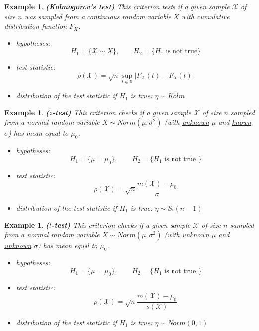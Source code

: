 \documentclass[12pt]{article}
\newtheorem{example}[theorem]{Example}
\begin{document}
\begin{example} \textbf{(Kolmogorov's test)} This criterion tests if a given
    sample $\mathscr{X}$ of size $n$ was sampled from a continuous random
    variable $X$ with cumulative distribution function $F_X$.
    \begin{itemize}
        \item hypotheses:
              $$H_1=\{\mathscr{X}\sim X\},\quad\quad H_2=\{H_1\mbox{ is not
                      true}\}$$
        \item test statistic:
              $$\rho(\mathscr{X})
                  =\sqrt{n}\sup_{t\in\mathbb{R}}|F_{\mathscr{X}}(t)-F_X(t)|$$
        \item distribution of the test statistic if $H_1$ is true: $\eta\sim Kolm$
    \end{itemize}
\end{example}

\begin{example} \textbf{($z$-test)} This criterion checks if a given sample
    $\mathscr{X}$ of size $n$ sampled from a normal random variable $X\sim
        Norm(\mu,\sigma^2)$ (with \underline{unknown} $\mu$ and \underline{known}
    $\sigma$) has mean equal to $\mu_0$.
    \begin{itemize}
        \item hypotheses:
              $$H_1=\{\mu=\mu_0\},\quad\quad H_2=\{H_1\mbox{ is not true }\}$$
        \item test statistic:
              $$\rho(\mathscr{X})=\sqrt{n}\frac{m(\mathscr{X})-\mu_0}{\sigma}$$
        \item distribution of the test statistic if $H_1$ is true: $\eta\sim
                  St(n-1)$
    \end{itemize}
\end{example}

\begin{example} \textbf{($t$-test)} This criterion checks if a given sample
    $\mathscr{X}$ of size $n$ sampled from a normal random variable
    $X\sim Norm(\mu,\sigma^2)$ (with \underline{unknown} $\mu$ and
    \underline{unknown} $\sigma$) has mean equal to $\mu_0$.
    \begin{itemize}
        \item hypotheses:
              $$H_1=\{\mu=\mu_0\},\quad\quad H_2=\{H_1\mbox{ is not true }\}$$
        \item test statistic:
              $$\rho(\mathscr{X})
                  =\sqrt{n}\frac{m(\mathscr{X})-\mu_0}{s(\mathscr{X})}$$
        \item distribution of the test statistic if $H_1$ is true: $\eta\sim
                  Norm(0,1)$
    \end{itemize}
\end{example}
\end{document}
